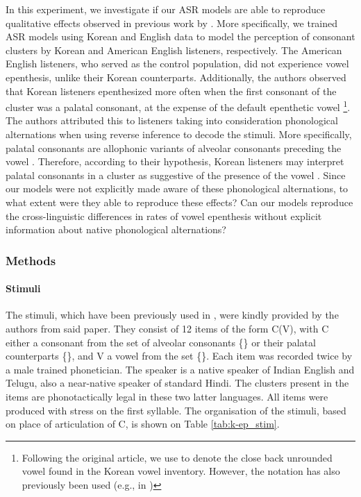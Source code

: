 {In this experiment, we investigate if our ASR models are able to reproduce qualitative effects observed in previous work by \cite{durvasula2015}. More specifically, we trained ASR models using Korean and English data to model the perception of consonant clusters by Korean and American English listeners, respectively. The American English listeners, who served as the control population, did not experience vowel epenthesis, unlike their Korean counterparts. Additionally, the authors observed that Korean listeners epenthesized  more often when the first consonant of the cluster was a palatal consonant, at the expense of the default epenthetic vowel \footnote{Following the original article, we use \textipa{[1]} to denote the close back unrounded vowel found in the Korean vowel inventory. However, the notation \textipa{[W]} has also previously been used (e.g., in \cite{kabak2007})}. The authors attributed this to listeners taking into consideration phonological alternations when using reverse inference to decode the stimuli. More specifically, palatal consonants are allophonic variants of alveolar consonants preceding the vowel . Therefore, according to their hypothesis, Korean listeners may interpret palatal consonants in a cluster as suggestive of the presence of the vowel .   
Since our models were not explicitly made aware of these phonological alternations, to what extent were they able to reproduce these effects? Can our models reproduce the cross-linguistic differences in rates of vowel epenthesis without explicit information about native phonological alternations? 

\subsubsection{Methods}
\paragraph{Stimuli}

The stimuli, which have been previously used in \cite{durvasula2015}, were kindly provided by the authors from said paper. They consist of 12 items of the form C(V), with \textsc{C} either a consonant from the set of alveolar consonants \{\} or their palatal counterparts \{\}, and \textsc{V} a vowel from the set \{\}.
Each item was recorded twice by a male trained phonetician. The speaker is a native speaker of Indian English and Telugu, also a near-native speaker of standard Hindi. The clusters present in the items are phonotactically legal in these two latter languages. All items were produced with stress on the first syllable.
The organisation of the stimuli, based on place of articulation of \textsc{C}, is shown on Table \ref{tab:k-ep_stim}.

}

